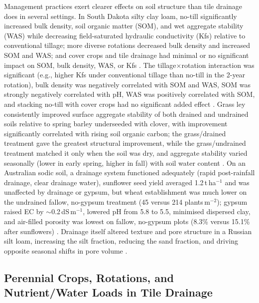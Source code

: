 Management practices exert clearer effects on soil structure than tile drainage does in several settings. In South Dakota silty clay loam, no-till significantly increased bulk density, soil organic matter (SOM), and wet aggregate stability (WAS) while decreasing field-saturated hydraulic conductivity (Kfs) relative to conventional tillage; more diverse rotations decreased bulk density and increased SOM and WAS; and cover crops and tile drainage had minimal or no significant impact on SOM, bulk density, WAS, or Kfs \parencite{Saha2024}. The tillage$\times$rotation interaction was significant (e.g., higher Kfs under conventional tillage than no-till in the 2-year rotation), bulk density was negatively correlated with SOM and WAS, SOM was strongly negatively correlated with pH, WAS was positively correlated with SOM, and stacking no-till with cover crops had no significant added effect \parencite{Saha2024}. Grass ley consistently improved surface aggregate stability of both drained and undrained soils relative to spring barley underseeded with clover, with improvement significantly correlated with rising soil organic carbon; the grass/drained treatment gave the greatest structural improvement, while the grass/undrained treatment matched it only when the soil was dry, and aggregate stability varied seasonally (lower in early spring, higher in fall) with soil water content \parencite{Hermawan1996}. On an Australian sodic soil, a drainage system functioned adequately (rapid post-rainfall drainage, clear drainage water), sunflower seed yield averaged 1.2\,t\,ha$^{-1}$ and was unaffected by drainage or gypsum, but wheat establishment was much lower on the undrained fallow, no-gypsum treatment (45 versus 214 plants\,m$^{-2}$); gypsum raised EC by $\sim$0.2\,dS\,m$^{-1}$, lowered pH from 5.8 to 5.5, minimised dispersed clay, and air-filled porosity was lowest on fallow, no-gypsum plots (8.3\% versus 15.1\% after sunflowers) \parencite{GARDNER1991}. Drainage itself altered texture and pore structure in a Russian silt loam, increasing the silt fraction, reducing the sand fraction, and driving opposite seasonal shifts in pore volume \parencite{Brikmans2025}.

\subsection{Perennial Crops, Rotations, and Nutrient/Water Loads in Tile Drainage}

